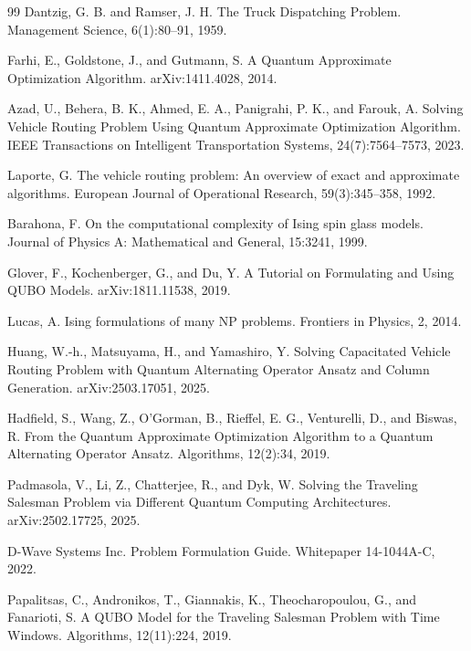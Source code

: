 \begin{thebibliography}{99}
Dantzig, G. B. and Ramser, J. H.
The Truck Dispatching Problem.
Management Science, 6(1):80--91, 1959.

Farhi, E., Goldstone, J., and Gutmann, S.
A Quantum Approximate Optimization Algorithm.
arXiv:1411.4028, 2014.

Azad, U., Behera, B. K., Ahmed, E. A., Panigrahi, P. K., and Farouk, A.
Solving Vehicle Routing Problem Using Quantum Approximate Optimization Algorithm.
IEEE Transactions on Intelligent Transportation Systems, 24(7):7564–7573, 2023.

Laporte, G.
The vehicle routing problem: An overview of exact and approximate algorithms.
European Journal of Operational Research, 59(3):345--358, 1992.

Barahona, F.
On the computational complexity of Ising spin glass models.
Journal of Physics A: Mathematical and General, 15:3241, 1999.

Glover, F., Kochenberger, G., and Du, Y.
A Tutorial on Formulating and Using QUBO Models.
arXiv:1811.11538, 2019.

Lucas, A.
Ising formulations of many NP problems.
Frontiers in Physics, 2, 2014.

Huang, W.-h., Matsuyama, H., and Yamashiro, Y.
Solving Capacitated Vehicle Routing Problem with Quantum Alternating Operator Ansatz and Column Generation.
arXiv:2503.17051, 2025.

Hadfield, S., Wang, Z., O’Gorman, B., Rieffel, E. G., Venturelli, D., and Biswas, R.
From the Quantum Approximate Optimization Algorithm to a Quantum Alternating Operator Ansatz.
Algorithms, 12(2):34, 2019.

Padmasola, V., Li, Z., Chatterjee, R., and Dyk, W.
Solving the Traveling Salesman Problem via Different Quantum Computing Architectures.
arXiv:2502.17725, 2025.

D-Wave Systems Inc.
Problem Formulation Guide.
Whitepaper 14-1044A-C, 2022.

Papalitsas, C., Andronikos, T., Giannakis, K., Theocharopoulou, G., and Fanarioti, S.
A QUBO Model for the Traveling Salesman Problem with Time Windows.
Algorithms, 12(11):224, 2019.


\end{thebibliography}
